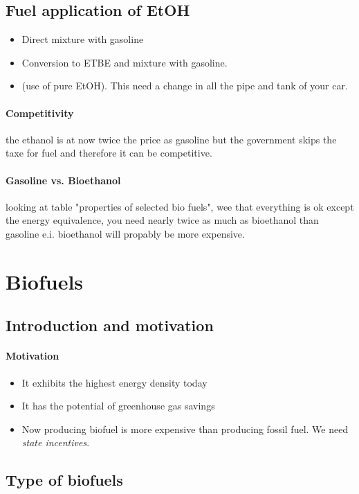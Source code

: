 \documentclass[10pt,a4paper]{article}
\begin{document}
\subsection{Fuel application of EtOH}

\begin{itemize}
\item Direct mixture with gasoline
\item Conversion to ETBE and mixture with gasoline.
\item (use of pure EtOH). This need a change in all the pipe and tank of your car.
\end{itemize}

\paragraph{Competitivity} the ethanol is at now twice the price as gasoline but the government skips the taxe for fuel and therefore it can be competitive. 

 \paragraph{Gasoline vs. Bioethanol} looking at table "properties of selected bio fuels", wee that everything is ok except the energy equivalence, you need nearly twice as much as bioethanol than gasoline e.i. bioethanol will propably be more expensive.
 



\section{Biofuels}
\subsection{Introduction and motivation}
\paragraph{Motivation}
\begin{itemize}
\item It exhibits the highest energy density today
\item It has the potential of greenhouse gas savings
\item Now producing biofuel is more expensive than producing fossil fuel. We need \emph{state incentives}.
\end{itemize}
\subsection{Type of biofuels}
\end{document}
